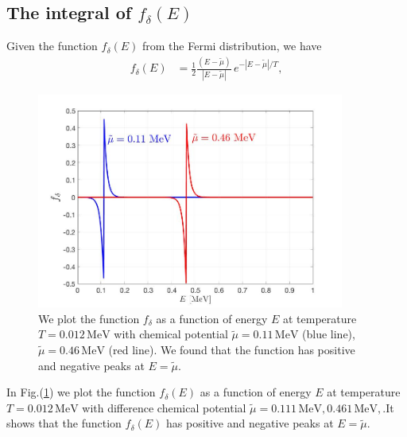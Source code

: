 \documentclass[sn-mathphys,Numbered]{sn-jnl}
\theoremstyle{thmstyleone}%
\theoremstyle{thmstyletwo}%
\theoremstyle{thmstylethree}%
\begin{document}
\subsection{The integral of $f_{\delta}(E)$}
Given the function $f_\delta(E)$ from the Fermi distribution, we have
\begin{align}
f_{\delta}(E)&=\frac{1}{2}\frac{(E-\tilde\mu)}{|E-\tilde\mu|}\,e^{-|E-\tilde\mu|/T},
\end{align}
\begin{figure}[ht]
\begin{center}
\includegraphics[width=0.9\textwidth]{./plot/f_delta}
\caption{We plot the function $f_\delta$ as a function of energy $E$ at temperature $T=0.012\,\mathrm{MeV}$ with chemical potential $\tilde\mu=0.11\,\mathrm{MeV}$ (blue line), 
 $\tilde\mu=0.46\,\mathrm{MeV}$ (red line). We found that the function has positive and negative peaks at  $E=\tilde\mu$. }
\label{f_delta_graph}
\end{center}
\end{figure}
In Fig.(\ref{f_delta_graph}) we plot the function $f_{\delta}(E)$ as a function of energy $E$ at temperature $T=0.012\,\mathrm{MeV}$ with difference chemical potential $\tilde\mu=0.111\,\mathrm{MeV},0.461\,\mathrm{MeV},$.It shows that the function $f_\delta(E)$ has positive and negative peaks at $E=\tilde\mu$.  
\end{document}
